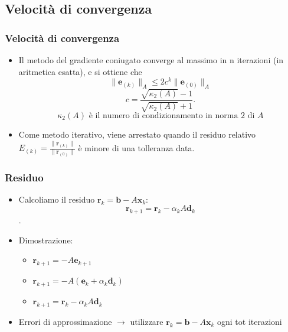 \documentclass[10pt]{beamer}
\begin{document}
\subsection{Velocità di convergenza}
\begin{frame}
\frametitle{Velocità di convergenza}
\begin{itemize}
    \item Il metodo del gradiente coniugato converge al massimo in $\mathrm{n}$ iterazioni (in aritmetica esatta), e si ottiene che %
    $$\|\mathbf{e}_{(k)}\|_A\leq2c^k\|\mathbf{e}_{(0)}\|_A$$
    $$ c=\frac{\sqrt{\kappa_2(A)}-1}{\sqrt{\kappa_2(A)}+1}.$$
    $$\kappa_2(A)\text{ è il numero di condizionamento in norma 2 di } A$$
    \item Come metodo iterativo, viene arrestato quando il residuo relativo $E_{(k)}=\frac{\|\mathbf{r}_{(k)}\|}{\|\mathbf{r}_{(0)}\|}$ è minore di una tolleranza data. 
\end{itemize}
\end{frame}


\begin{frame} \frametitle{Residuo}
\begin{itemize}
\item Calcoliamo il \alert{residuo} $\mathbf{r}_k =\mathbf{b}-A\mathbf{x}_k$: 
$$\mathbf{r}_{k+1}=\mathbf{r}_k-\alpha_kA\mathbf{d}_{k}$$ .

\item Dimostrazione:
\begin{itemize}
    \item $\mathbf{r}_{k+1}=-A\mathbf{e}_{k+1}$
    \item $\mathbf{r}_{k+1}=-A\left(\mathbf{e}_k+\alpha_k\mathbf{d}_k \right)$
    \item $\mathbf{r}_{k+1}=\mathbf{r}_k-\alpha_kA\mathbf{d}_{k}$
    
    \end{itemize}

\item Errori di approssimazione $\rightarrow$ utilizzare $\mathbf{r}_k =\mathbf{b}-A\mathbf{x}_k$ ogni tot iterazioni
\end{itemize}
\end{frame}
\end{document}
